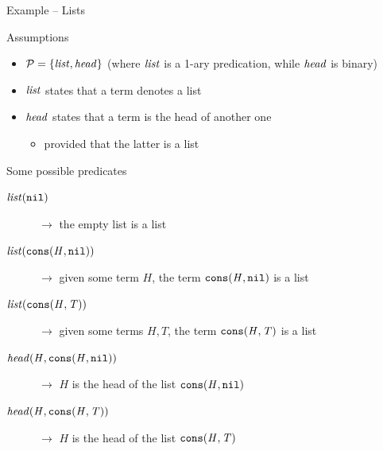 \documentclass[presentation]{beamer}\mode<presentation>{\usetheme{AMSBolognaFC}}
\begin{document}
\begin{frame}{Example -- Lists}
    \begin{block}{Assumptions}
        \begin{itemize}
            \item $\mathcal{P} = \{ \text{\textit{list}}, \text{\textit{head}} \}$ \hfill {\footnotesize(where $\text{\textit{list}}$ is a 1-ary predication, while $\text{\textit{head}}$ is binary)}
            \item $\text{\textit{list}}$ states that a term denotes a \alert{list}
            \item $\text{\textit{head}}$ states that a term is the \alert{head} of another one
            \begin{itemize}
                \item provided that the latter is a list
            \end{itemize}
        \end{itemize}
    \end{block}
    \begin{exampleblock}{Some possible predicates}
        \begin{description}
            \item[$\text{\textit{list}}(\mathtt{nil})$] $\rightarrow$ the empty list is a list
            \item[$\text{\textit{list}}(\mathtt{cons}(\mathit{H}, \mathtt{nil}))$] $\rightarrow$ given some term $H$, the term $\mathtt{cons}(\mathit{H}, \mathtt{nil})$ is a list
            \item[$\text{\textit{list}}(\mathtt{cons}(\mathit{H}, \mathit{T}))$] $\rightarrow$ given some terms $H, T$, the term $\mathtt{cons}(\mathit{H}, \mathit{T})$ is a list
            \item[$\text{\textit{head}}(\mathit{H}, \mathtt{cons}(\mathit{H}, \mathtt{nil}))$] $\rightarrow$ $H$ is the head of the list $\mathtt{cons}(\mathit{H}, \mathtt{nil})$
            \item[$\text{\textit{head}}(\mathit{H}, \mathtt{cons}(\mathit{H}, \mathit{T}))$] $\rightarrow$ $H$ is the head of the list $\mathtt{cons}(\mathit{H}, \mathit{T})$
        \end{description}
    \end{exampleblock}
\end{frame}
\end{document}
